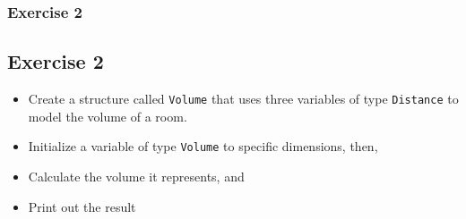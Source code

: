 \documentclass{beamer}
\begin{document}
\begin{frame}
    \frametitle{Exercise 2}
    \subsection{Exercise 2} %
    \label{sub:exercise_2}
    \begin{itemize}
        \item Create a structure called \texttt{Volume} that uses three variables of type \texttt{Distance} to model the volume of a room.
        \item Initialize a variable of type \texttt{Volume} to specific dimensions, then,
        \item Calculate the volume it represents, and
        \item Print out the result
    \end{itemize}
\end{frame}
\end{document}
